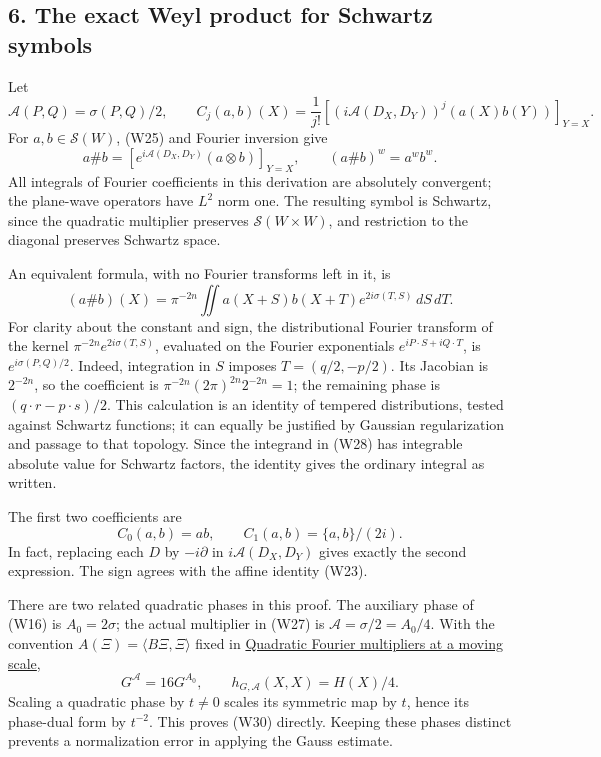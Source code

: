 \documentclass[
  11pt,
]{article}
\begin{document}
\subsection{6. The exact Weyl product for Schwartz
symbols}\label{the-exact-weyl-product-for-schwartz-symbols}

Let \[
\mathcal A(P,Q)=\sigma(P,Q)/2,
\qquad
C_j(a,b)(X)=\frac1{j!}
\left[(i\mathcal A(D_X,D_Y))^j(a(X)b(Y))\right]_{Y=X}.
\tag{W26}
\] For \(a,b\in\mathcal S(W)\), (W25) and Fourier inversion give \[
a\#b=\left[e^{i\mathcal A(D_X,D_Y)}(a\otimes b)\right]_{Y=X},
\qquad (a\#b)^w=a^wb^w.
\tag{W27}
\] All integrals of Fourier coefficients in this derivation are
absolutely convergent; the plane-wave operators have \(L^2\) norm one.
The resulting symbol is Schwartz, since the quadratic multiplier
preserves \(\mathcal S(W\times W)\), and restriction to the diagonal
preserves Schwartz space.

An equivalent formula, with no Fourier transforms left in it, is \[
(a\#b)(X)=\pi^{-2n}\iint
a(X+S)b(X+T)e^{2i\sigma(T,S)}\,dS\,dT.
\tag{W28}
\] For clarity about the constant and sign, the distributional Fourier
transform of the kernel \(\pi^{-2n}e^{2i\sigma(T,S)}\), evaluated on the
Fourier exponentials \(e^{iP\cdot S+iQ\cdot T}\), is
\(e^{i\sigma(P,Q)/2}\). Indeed, integration in \(S\) imposes
\(T=(q/2,-p/2)\). Its Jacobian is \(2^{-2n}\), so the coefficient is
\(\pi^{-2n}(2\pi)^{2n}2^{-2n}=1\); the remaining phase is
\((q\cdot r-p\cdot s)/2\). This calculation is an identity of tempered
distributions, tested against Schwartz functions; it can equally be
justified by Gaussian regularization and passage to that topology. Since
the integrand in (W28) has integrable absolute value for Schwartz
factors, the identity gives the ordinary integral as written.

The first two coefficients are \[
C_0(a,b)=ab,\qquad C_1(a,b)=\{a,b\}/(2i).
\tag{W29}
\] In fact, replacing each \(D\) by \(-i\partial\) in
\(i\mathcal A(D_X,D_Y)\) gives exactly the second expression. The sign
agrees with the affine identity (W23).

There are two related quadratic phases in this proof. The auxiliary
phase of (W16) is \(A_0=2\sigma\); the actual multiplier in (W27) is
\(\mathcal A=\sigma/2=A_0/4\). With the convention
\(A(\Xi)=\langle B\Xi,\Xi\rangle\) fixed in
\href{gauss-transform-estimates.pdf}{Quadratic Fourier multipliers at a
moving scale}, \[
G^{\mathcal A}=16G^{A_0},\qquad
h_{G,\mathcal A}(X,X)=H(X)/4.
\tag{W30}
\] Scaling a quadratic phase by \(t\ne0\) scales its symmetric map by
\(t\), hence its phase-dual form by \(t^{-2}\). This proves (W30)
directly. Keeping these phases distinct prevents a normalization error
in applying the Gauss estimate.
\end{document}

